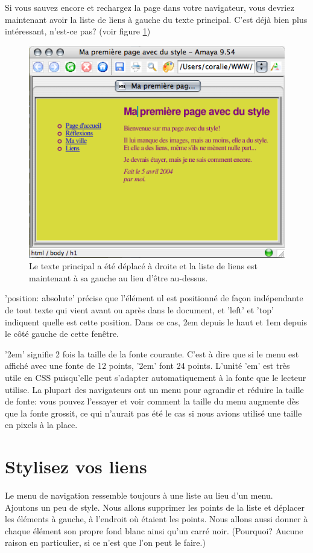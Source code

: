 Si vous sauvez encore et rechargez la page dans votre navigateur, vous devriez maintenant avoir la liste de liens à gauche du texte principal. C'est déjà bien plus intéressant, n'est-ce pas? (voir figure \ref{fig:screen5})
\begin{figure}[t]
	\begin{center}
		\caption{Le texte principal a été déplacé à droite et la liste de liens est maintenant à sa gauche au lieu d'être au-dessus. }
		\label{fig:screen5}
		\includegraphics{voronin/img/capture4.png}	
	\end{center}
\end{figure}
'position: absolute' précise que l'élément ul est positionné de façon indépendante de tout texte qui vient avant ou après dans le document, et 'left' et 'top' indiquent quelle est cette position. Dans ce cas, 2em depuis le haut et 1em depuis le côté gauche de cette fenêtre.

'2em' signifie 2 fois la taille de la fonte courante. C'est à dire que si le menu est affiché avec une fonte de 12 points, '2em' font 24 points. L'unité 'em' est très utile en CSS puisqu'elle peut s'adapter automatiquement à la fonte que le lecteur utilise. La plupart des navigateurs ont un menu pour agrandir et réduire la taille de fonte: vous pouvez l'essayer et voir comment la taille du menu augmente dès que la fonte grossit, ce qui n'aurait pas été le cas si nous avions utilisé une taille en pixels à la place. 
\normalsize
\section{Stylisez vos liens}
Le menu de navigation ressemble toujours à une liste au lieu d'un menu. Ajoutons un peu de style. Nous allons supprimer les points de la liste et déplacer les éléments à gauche, à l'endroit où étaient les points. Nous allons aussi donner à chaque élément son propre fond blanc ainsi qu'un carré noir. (Pourquoi? Aucune raison en particulier, si ce n'est que l'on peut le faire.)

